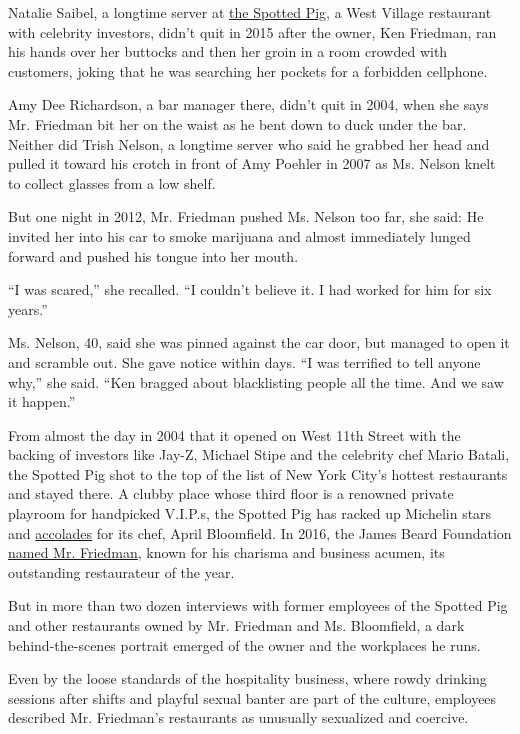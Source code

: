 Natalie Saibel, a longtime server at
\href{https://www.thespottedpig.com/\#home}{the Spotted Pig}, a West
Village restaurant with celebrity investors, didn't quit in 2015 after
the owner, Ken Friedman, ran his hands over her buttocks and then her
groin in a room crowded with customers, joking that he was searching her
pockets for a forbidden cellphone.

Amy Dee Richardson, a bar manager there, didn't quit in 2004, when she
says Mr. Friedman bit her on the waist as he bent down to duck under the
bar. Neither did Trish Nelson, a longtime server who said he grabbed her
head and pulled it toward his crotch in front of Amy Poehler in 2007 as
Ms. Nelson knelt to collect glasses from a low shelf.

But one night in 2012, Mr. Friedman pushed Ms. Nelson too far, she said:
He invited her into his car to smoke marijuana and almost immediately
lunged forward and pushed his tongue into her mouth.

``I was scared,'' she recalled. ``I couldn't believe it. I had worked
for him for six years.''

Ms. Nelson, 40, said she was pinned against the car door, but managed to
open it and scramble out. She gave notice within days. ``I was terrified
to tell anyone why,'' she said. ``Ken bragged about blacklisting people
all the time. And we saw it happen.''

From almost the day in 2004 that it opened on West 11th Street with the
backing of investors like Jay-Z, Michael Stipe and the celebrity chef
Mario Batali, the Spotted Pig shot to the top of the list of New York
City's hottest restaurants and stayed there. A clubby place whose third
floor is a renowned private playroom for handpicked V.I.P.s, the Spotted
Pig has racked up Michelin stars and
\href{http://www.nytimes3xbfgragh.onion/2006/01/25/dining/reviews/25rest.html}{accolades}
for its chef, April Bloomfield. In 2016, the James Beard Foundation
\href{https://www.jamesbeard.org/blog/2016-james-beard-award-winners}{named
Mr. Friedman}, known for his charisma and business acumen, its
outstanding restaurateur of the year.

But in more than two dozen interviews with former employees of the
Spotted Pig and other restaurants owned by Mr. Friedman and Ms.
Bloomfield, a dark behind-the-scenes portrait emerged of the owner and
the workplaces he runs.

Even by the loose standards of the hospitality business, where rowdy
drinking sessions after shifts and playful sexual banter are part of the
culture, employees described Mr. Friedman's restaurants as unusually
sexualized and coercive.

